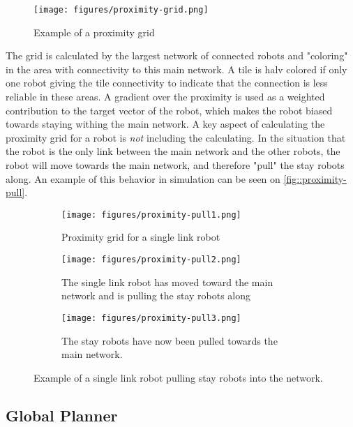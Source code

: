 \begin{figure}[h]
    \begin{center}
        \texttt{[image: figures/proximity-grid.png]}
    \end{center}
    \caption{Example of a proximity grid}\label{fig:proximity-grid}
\end{figure}

The grid is calculated by the largest network of connected robots and "coloring" in the area with connectivity to this main network. A tile is halv colored if only one robot giving the tile connectivity to indicate that the connection is less reliable in these areas. A {\color{red} gradient} over the proximity is used as a weighted contribution to the target vector of the robot, which makes the robot biased towards staying withing the main network. A key aspect of calculating the proximity grid for a robot is \emph{not} including the calculating. In the situation that the robot is the only link between the main network and the other robots, the robot will move towards the main network, and therefore "pull" the stay robots along. An example of this behavior in simulation can be seen on \cref{fig::proximity-pull}.

\begin{figure}[h]
    \begin{center}
        \begin{subfigure}[b]{0.31\textwidth}
            \centering
            \texttt{[image: figures/proximity-pull1.png]}
            \caption{Proximity grid for a {\color{red} single link} robot}
            \label{fig:proximity-pull1}
        \end{subfigure}
        \begin{subfigure}[b]{0.31\textwidth}
            \centering
            \texttt{[image: figures/proximity-pull2.png]}
            \caption{The single link robot has moved toward the main network and is pulling the stay robots along}
            \label{fig:proximity-pull2}
        \end{subfigure}
        \begin{subfigure}[b]{0.31\textwidth}
            \centering
            \texttt{[image: figures/proximity-pull3.png]}
            \caption{The stay robots have now been pulled towards the main network.}
            \label{fig:proximity-pull3}
        \end{subfigure}
    \end{center}
    \caption{Example of a {\color{red} single link} robot pulling stay robots into the network.}\label{fig:proximity-pull}
\end{figure}




\subsection{Global Planner}
